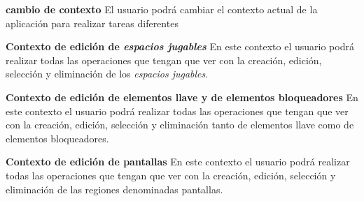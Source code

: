 \begin{functional}
	\item \textbf{cambio de contexto}\newline
		El usuario podrá cambiar el contexto actual de la aplicación para realizar tareas diferentes
		\begin{functional}
			\item \textbf{Contexto de edición de \textit{espacios jugables}}\newline
				En este contexto el usuario podrá realizar todas las operaciones que tengan que ver con la creación, edición, selección y eliminación de los \textit{espacios jugables}.
			\item \textbf{Contexto de edición de elementos llave y de elementos bloqueadores}\newline
				En este contexto el usuario podrá realizar todas las operaciones que tengan que ver con la creación, edición, selección y eliminación tanto de elementos llave como de elementos bloqueadores.
			\item \textbf{Contexto de edición de pantallas}\newline
				En este contexto el usuario podrá realizar todas las operaciones que tengan que ver con la creación, edición, selección y eliminación de las regiones denominadas pantallas.
		\end{functional}
\end{functional}